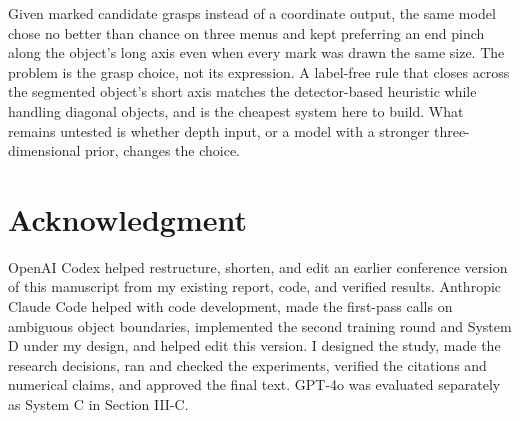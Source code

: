 \documentclass[10pt,conference,compsoc]{IEEEtran}
\begin{document}
Given marked candidate grasps instead of a coordinate output, the same model
chose no better than chance on three menus and kept preferring an end pinch
along the object's long axis even when every mark was drawn the same size.
The problem is the grasp choice, not its expression. A label-free rule that
closes across the segmented object's short axis matches the detector-based
heuristic while handling diagonal objects, and is the cheapest system here
to build. What remains untested is whether depth input, or a model with a
stronger three-dimensional prior, changes the choice.

\section*{Acknowledgment}

OpenAI Codex helped restructure, shorten, and edit an earlier conference
version of this manuscript from my existing report, code, and verified
results. Anthropic Claude Code helped with code development, made the
first-pass calls on ambiguous object boundaries, implemented the second
training round and System D under my design, and helped edit this
version. I designed the study, made the research decisions, ran and checked
the experiments, verified the citations and numerical claims, and approved
the final text. GPT-4o was evaluated separately as System C in Section III-C.
\end{document}

